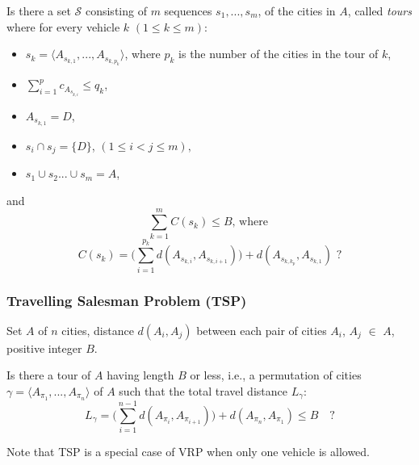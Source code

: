 \documentclass{mpaper}
\begin{document}
\begin{question}
Is there a set $\mathcal{S}$ consisting of $m$ sequences $s_{1},...,s_{m}$, of the cities in $A$, called \textit{tours}
where for every vehicle $k$ $(1 \leq k \leq m)$:
\begin{itemize}
\vspace{-1mm}
\item $s_{k} = \langle A_{s_{k,1}},...,A_{s_{k,p_{k}}} \rangle$, \quad where $p_{k}$ is the number of the cities in the tour of $k$,
\item $\sum_{i = 1}^{p} c_{A_{s_{k,i}}} \leq q_{k}$,
\item $A_{s_{k,1}} = D$,
\item $s_{i} \cap s_{j} = \{D\}$, \quad $(1 \leq i < j \leq m),$
\item $s_{1} \cup s_{2} ... \cup s_{m} = A$,
\end{itemize}
and
\vspace{-1mm}
$$ \sum_{k=1}^{m} C(s_{k}) \leq B \textrm{, where } $$
\vspace{-1mm}
$$C(s_{k}) = \bigg( \sum_{i=1}^{p_{k}} d(A_{s_{k,i}}, A_{s_{k,i+1}}) \bigg) + d(A_{s_{k,k_{p}}}, A_{s_{k,1}}) \textrm{ ?}$$
\end{question}

\subsubsection{Travelling Salesman Problem (TSP)}
\begin{instance}
Set $A$ of $n$ cities, distance $d(A_{i}, A_{j})$ between each pair of cities $A_{i}$, $A_{j}$ $\in$ $A$, positive integer $B$.
\end{instance}

\begin{question}
Is there a tour of $A$ having length $B$ or less, i.e., a permutation of cities $\gamma = \langle A_{\pi_{1}},...,A_{\pi_{n}} \rangle $ of $A$ such that the total travel distance $L_{\gamma}$:
\vspace{-1mm}
$$L_{\gamma} = \bigg( \sum_{i=1}^{n-1} d(A_{\pi_{i}}, A_{\pi_{i+1}}) \bigg) + d(A_{\pi_{n}}, A_{\pi_{1}}) \leq B \quad \textrm{?}$$
\end{question}

Note that TSP is a special case of VRP when only one vehicle is allowed.
\end{document}

